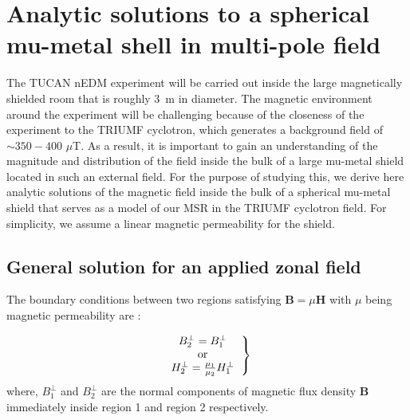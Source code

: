 
\chapter{Analytic solutions to a spherical mu-metal shell in multi-pole field}

The TUCAN nEDM experiment will be carried out inside the large magnetically shielded room that is roughly 3~m in diameter.  The magnetic environment around the experiment will be challenging because of the closeness of the experiment to the TRIUMF cyclotron, which generates a background field of $\sim 350 - 400$ $\mu$T.
As a result, it is important to gain an understanding of the magnitude and distribution of the field inside  the bulk of a large mu-metal shield located in such an external field. For the purpose of studying this, we derive here analytic solutions of the magnetic field inside the bulk of a spherical mu-metal shield that serves as a model of our MSR in the TRIUMF cyclotron field.  For simplicity, we assume a linear magnetic permeability for the shield.


\section{General solution for an applied zonal field}
The boundary conditions between two regions satisfying $\bm{B}=\mu \bm{H}$ with $\mu$ being  magnetic permeability are :


\begin{equation}\label{b1}   
\left.
  \begin{tabular}{ccc}
  $B_2^\bot=B_1^\bot$\\
  or \\
  $H_2^\bot=\frac{\mu_{1}}{\mu_{2}}H_1^\bot$
  \end{tabular}
 \right\}
\end{equation}
where, $B_1^\bot$ and $B_2^\bot$ are the normal components of magnetic flux density $\bm{B}$ immediately inside region 1 and region 2 respectively.

